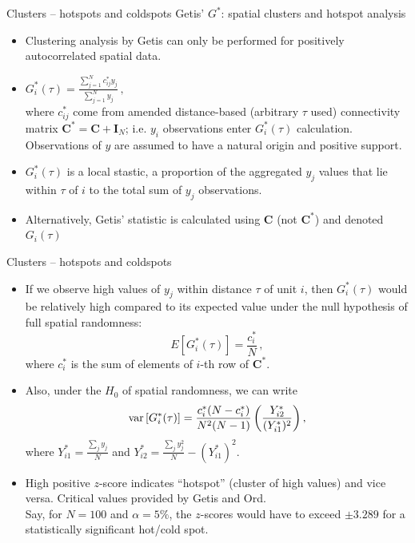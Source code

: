 \documentclass{beamer}
\begin{document}
\begin{frame}{Clusters -- hotspots and coldspots}
Getis' $G^{\ast}$: spatial clusters and hotspot analysis\\
\smallskip
\begin{itemize}
    \item Clustering analysis by Getis can only be performed for positively autocorrelated spatial data.
    \smallskip
    \item $G_i^{\ast}(\tau) = \frac{\sum_{j=1}^N c_{ij}^{\ast} y_j}{\sum_{j=1}^N y_j} \,,$\\
    \smallskip
    where $c_{ij}^{\ast}$ come from amended distance-based (arbitrary $\tau$ used) connectivity matrix $\bm{C}^{\ast} = \bm{C}+\bm{I}_N$; i.e. $y_i$ observations enter $G_i^{\ast}(\tau)$ calculation. Observations of $y$ are assumed to have a natural origin and positive support.
    \smallskip
    \item $G_i^{\ast}(\tau)$ is a local stastic, a proportion of the aggregated $y_j$ values that lie within $\tau$ of $i$ to the total sum of $y_j$ observations.
    \smallskip
    \item Alternatively, Getis' statistic is calculated using $\bm{C}$ (not $\bm{C}^{\ast}$) and denoted $G_i(\tau)$ 
\end{itemize}
\end{frame}
\begin{frame}{Clusters -- hotspots and coldspots}
\begin{itemize}
    \item If we observe high values of $y_j$ within distance $\tau$ of unit $i$, then $G_i^{\ast}(\tau)$ would be relatively high compared to its expected value under the null hypothesis of full spatial randomness: $$E \left[G_i^{\ast}(\tau) \right] = \frac{c_i^{\ast}}{N}\,,$$ where $c_i^{\ast}$ is the sum of elements of $i$-th row of $\bm{C}^{\ast}$.
    \medskip 
    \item Also, under the $H_0$ of spatial randomness, we can write
    $$
    \textnormal{var} \left[G_i^*(\tau) \right] = 
    \frac{c_i^*(N-c_i^*)}{N^2 (N-1)}
    \left( \frac{Y_{i2}^*}{(Y_{i1}^*)^2} \right) , 
    $$ 
    where $Y_{i1}^*=\tfrac{\sum_j y_j}{N}$ and $Y_{i2}^*=\tfrac{\sum_j y_j^2}{N}-(Y_{i1}^*)^2$.
    \medskip 
    \item High positive $z$-score indicates ``hotspot'' (cluster of high values) and vice versa. Critical values provided by Getis and Ord. \\Say, for $N = 100$ and $\alpha = 5\%$, the $z$-scores would have to exceed $\pm 3.289$ for a statistically significant hot/cold spot.
\end{itemize}
\end{frame}
\end{document}
